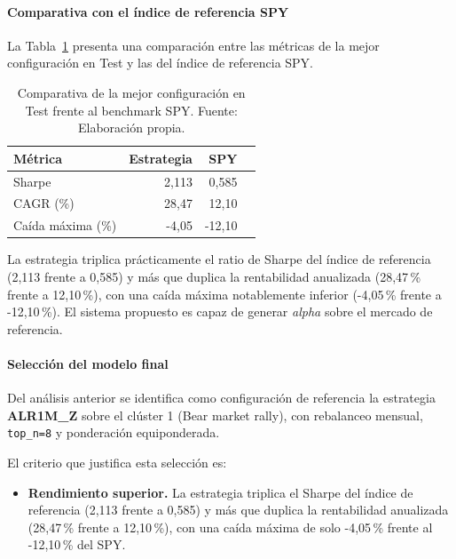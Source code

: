 \paragraph{Comparativa con el índice de referencia SPY}

La Tabla~\ref{tab:comparativa_spy} presenta una comparación
entre las métricas de la mejor configuración
en Test y las del índice de referencia SPY.

\begin{table}[H]
\centering
\begin{tabular}{lrrr}
\toprule
\textbf{Métrica} & \textbf{Estrategia} & \textbf{SPY} \\
\midrule
Sharpe                & 2,113 & 0,585 \\
CAGR (\%)             & 28,47 & 12,10 \\
Caída máxima (\%)     & -4,05 & -12,10 \\
\bottomrule
\end{tabular}
\caption{Comparativa de la mejor configuración en Test frente al
benchmark SPY. Fuente: Elaboración propia.}
\label{tab:comparativa_spy}
\end{table}

La estrategia triplica prácticamente el ratio de Sharpe
del índice de referencia (2,113 frente a 0,585) y más que duplica
la rentabilidad anualizada (28,47\,\% frente a 12,10\,\%),
con una caída máxima notablemente inferior (-4,05\,\% frente a
-12,10\,\%). El sistema propuesto es capaz de generar
\textit{alpha} sobre el mercado de referencia.


\paragraph{Selección del modelo final}

Del análisis anterior se identifica como configuración de
referencia la estrategia \textbf{ALR1M\_Z} sobre el clúster 1
(Bear market rally), con rebalanceo mensual,
\texttt{top\_n=8} y ponderación equiponderada.

El criterio que justifica esta selección es:

\begin{itemize}
    \item \textbf{Rendimiento superior.} La estrategia triplica el
    Sharpe del índice de referencia (2,113 frente a 0,585) y más
    que duplica la rentabilidad anualizada (28,47\,\% frente a
    12,10\,\%), con una caída máxima de solo -4,05\,\% frente al
    -12,10\,\% del SPY.

    
\end{itemize}


